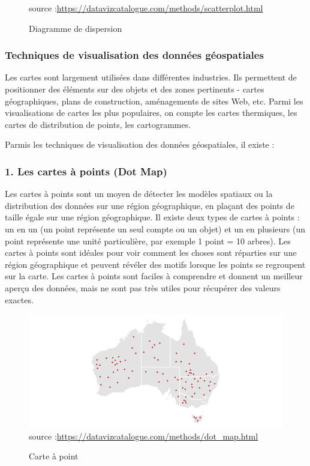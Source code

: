 \documentclass[french, a4paper, 12pt]{report}
\begin{document}
\begin{figure}[!htb]
\begin{minipage}{0.35\linewidth}
    \scriptsize{source :\url{https://datavizcatalogue.com/methods/scatterplot.html}}
    \caption{Diagramme de dispersion}
 \label{fig:4.6}
\end{minipage}
\end{figure}

\subsubsection{Techniques de visualisation des données géospatiales}
Les cartes sont largement utilisées dans différentes industries. Ils permettent de positionner des éléments sur des objets et des zones pertinents - cartes géographiques, plans de construction, aménagements de sites Web, etc. Parmi les visualisations de cartes les plus populaires, on compte les cartes thermiques, les cartes de distribution de points, les cartogrammes.

Parmis les techniques de visualisation des données géospatiales, il existe : 
\subsubsection{1. Les cartes à points (Dot Map)}
Les cartes à points sont un moyen de détecter les modèles spatiaux ou la distribution des données sur une région géographique, en plaçant des points de taille égale sur une région géographique.
Il existe deux types de cartes à points : un en un (un point représente un seul compte ou un objet) et un en plusieurs (un point représente une unité particulière, par exemple 1 point = 10 arbres).
Les cartes à points sont idéales pour voir comment les choses sont réparties sur une région géographique et peuvent révéler des motifs lorsque les points se regroupent sur la carte. Les cartes à points sont faciles à comprendre et donnent un meilleur aperçu des données, mais ne sont pas très utiles pour récupérer des valeurs exactes.
\begin{figure}[!ht]
    \centering
    \includegraphics[height=5cm]{images/dot_map.png}
    \scriptsize{source :\url{https://datavizcatalogue.com/methods/dot_map.html}}
    \caption{Carte à point}
    \label{fig:2.7}
\end{figure}
\end{document}
